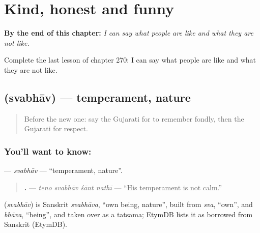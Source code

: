 
\chapter{Kind, honest and funny}
\label{ch:gu-kind-honest-and-funny}

\begin{chapteropening}
\textbf{By the end of this chapter:} \emph{I can say what people are like and what they are not like.}

Complete the last lesson of chapter 270: I can say what people are like and what they are not like.
\end{chapteropening}

\section[\texorpdfstring{\gu{સ્વભાવ} (svabhāv)}{સ્વભાવ (svabhāv)}]{ (svabhāv) — temperament, nature}

\label{lesson:GU-C270-svabhav}



\begin{quote}
Before the new one: say the Gujarati for to remember fondly, then the Gujarati for respect.
\end{quote}

\subsection*{You'll want to know: }
\textbf{} — \emph{svabhāv} — \textquotedblleft{}temperament, nature\textquotedblright{}.

\begin{quote}
\textbf{   .} — \emph{teno svabhāv śānt nathī} — \textquotedblleft{}His temperament is not calm.\textquotedblright{}
\end{quote}

\begin{cousinweb}
\textbf{} (\emph{svabhāv}) is Sanskrit \emph{svabhāva}, \textquotedblleft{}own being, nature\textquotedblright{}, built from \emph{sva}, \textquotedblleft{}own\textquotedblright{}, and \emph{bhāva}, \textquotedblleft{}being\textquotedblright{}, and taken over as a tatsama; EtymDB lists it as borrowed from Sanskrit (EtymDB).
\end{cousinweb}

